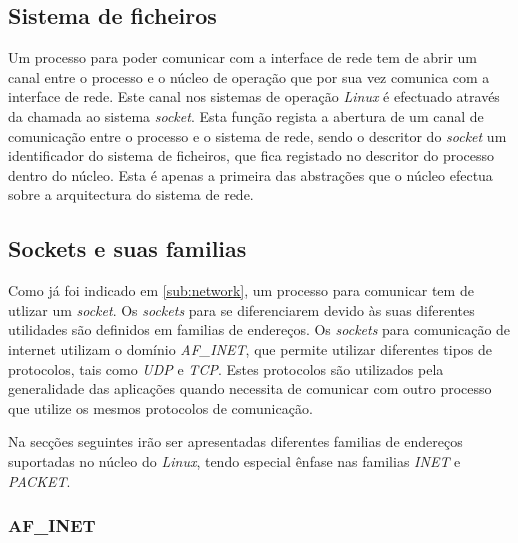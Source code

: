 \subsection{Sistema de ficheiros}

Um processo para poder comunicar com a interface de rede tem de abrir um canal entre o processo e o núcleo de operação que por sua vez comunica com a interface de rede.
 Este canal nos sistemas de operação \textit{Linux} é efectuado através da chamada ao sistema \textit{socket}.
 Esta função regista a abertura de um canal de comunicação entre o processo e o sistema de rede, sendo o descritor do \textit{socket} um identificador do sistema de ficheiros, que fica registado no descritor do processo dentro do núcleo.
 Esta é apenas a primeira das abstrações que o núcleo efectua sobre a arquitectura do sistema de rede.
  


\subsection{Sockets e suas familias}
\label{sub:sockets}

Como já foi indicado em \ref{sub:network}, um processo para comunicar tem de utlizar um \textit{socket}.
 Os \textit{sockets} para se diferenciarem devido às suas diferentes utilidades são definidos em  familias de endereços.
 Os \textit{sockets} para comunicação de internet utilizam o domínio \textit{AF\_INET}, que permite utilizar diferentes tipos de protocolos, tais como \textit{UDP} e \textit{TCP}.
 Estes protocolos são utilizados pela generalidade das aplicações quando necessita de comunicar com outro processo que utilize os mesmos protocolos de comunicação.

Na secções seguintes irão ser apresentadas diferentes familias de endereços suportadas no núcleo do \textit{Linux}, tendo especial ênfase nas familias \textit{INET} e \textit{PACKET}.


\subsubsection{AF\_INET}
\label{subsub:af_inet}

